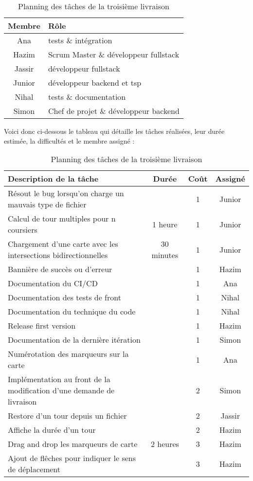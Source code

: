 \documentclass[a4paper]{article}
\begin{document}
\begin{table}[H]
    \centering
    \begin{tabularx}{0.6\textwidth}{|c|X|}
    \hline
    \textbf{Membre} & \textbf{Rôle} \\ \hline
    Ana  & tests \& intégration \\ \hline
    Hazim & Scrum Master \& développeur fullstack \\ \hline
    Jassir & développeur fullstack \\ \hline
    Junior &  développeur backend et tsp \\ \hline
    Nihal  & tests \& documentation \\ \hline
    Simon & Chef de projet \& développeur backend \\ \hline
    \end{tabularx}
    \caption{Planning des tâches de la troisième livraison}
    \end{table}

Voici donc ci-dessous le tableau qui détaille les tâches réalisées, leur durée estimée, la difficultés et le membre assigné :
\begin{table}[H]
\centering
\begin{tabularx}{\textwidth}{|X|c|c|c|}
\hline
\textbf{Description de la tâche} & \textbf{Durée} & \textbf{Coût} & \textbf{Assigné} \\ \hline
Résout le bug lorsqu'on charge un mauvais type de fichier &  & 1 & Junior \\ \hline
Calcul de tour multiples pour n coursiers & 1 heure & 1 & Junior \\ \hline
Chargement d'une carte avec les intersections bidirectionnelles & 30 minutes & 1 & Junior \\ \hline
Bannière de succès ou d'erreur &  & 1 & Hazim \\ \hline
Documentation du CI/CD &  & 1 & Ana \\ \hline
Documentation des tests de front &  & 1 & Nihal \\ \hline
Documentation du technique du code &  & 1 & Nihal \\ \hline
Release first version &  & 1 & Hazim \\ \hline
Documentation de la dernière itération &  & 1 & Simon \\ \hline
Numérotation des marqueurs sur la carte &  & 1 & Ana \\ \hline
Implémentation au front de la modification d'une demande de livraison &  & 2 & Simon \\ \hline
Restore d'un tour depuis un fichier &  & 2 & Jassir \\ \hline
Affiche la durée d'un tour &  & 2 & Hazim \\ \hline
Drag and drop les marqueurs de carte & 2 heures & 3 & Hazim \\ \hline
Ajout de flêches pour indiquer le sens de déplacement &  & 3 & Hazim \\ \hline
\end{tabularx}
\caption{Planning des tâches de la troisième livraison}
\end{table}
\end{document}
